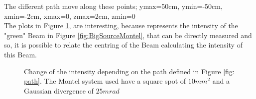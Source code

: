 The different path move along these points; ymax=50cm, ymin=-50cm, xmin=-2cm, xmax=0, zmax=2cm, zmin=0
\\
The plots in Figure \ref{fig: 2nd reuslt diff. path}, are interesting, because represents the intensity of the "green" Beam in Figure \ref{fig:BigSourceMontel}, that can be directly measured and so, it is possible to relate the centring of the Beam calculating the intensity of this Beam.
%
\begin{figure}[]
%
\centering
%
%
\quad
%
%
\caption{Change of the intensity depending on the path defined in Figure \ref{fig: path}. The Montel system used have a square spot of $10 mm^2 $ and a Gaussian divergence of $25mrad $}
%
\label{fig: 2nd reuslt diff. path}
%
\end{figure}
